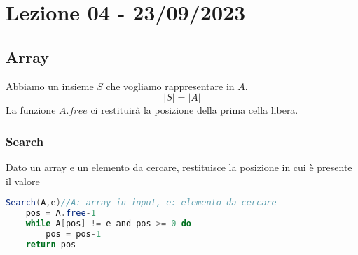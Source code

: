 \section{Lezione 04 - 23/09/2023}
\subsection{Array}
Abbiamo un insieme $S$ che vogliamo rappresentare in $A$.\\
$$ |S| = |A| $$
La funzione $A.free$ ci restituirà la posizione della prima cella libera.\\


\subsubsection{Search}
Dato un array e un elemento da cercare, restituisce la posizione in cui è presente il valore
\begin{lstlisting}[language=Java]
Search(A,e)//A: array in input, e: elemento da cercare
	pos = A.free-1
	while A[pos] != e and pos >= 0 do
		pos = pos-1
	return pos
\end{lstlisting}



